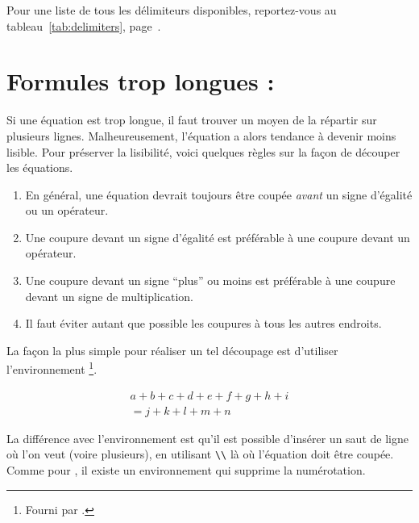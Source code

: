 Pour une liste de tous les délimiteurs disponibles, reportez-vous au
tableau~\ref{tab:delimiters}, page~\pageref{tab:delimiters}.


\section{Formules trop longues : }
\label{sec:multline}


Si une équation est trop longue, il faut trouver un moyen de la répartir sur
plusieurs lignes. Malheureusement, l'équation a alors tendance à devenir moins
lisible. Pour préserver la lisibilité, voici quelques règles sur la façon de
découper les équations.
\begin{enumerate}
  \item En général, une équation devrait toujours être coupée \emph{avant} un
    signe d'égalité ou un opérateur.
  \item Une coupure devant un signe d'égalité est préférable à une coupure
    devant un opérateur.
  \item Une coupure devant un signe \enquote{plus} ou moins est préférable à une
    coupure devant un signe de multiplication.
  \item Il faut éviter autant que possible les coupures à tous les autres
    endroits.
\end{enumerate}
La façon la plus simple pour réaliser un tel découpage est d'utiliser
l'environnement \footnote{Fourni par .}.
\begin{example}
\begin{multline}
  a + b + c + d + e + f 
  + g + h + i  
  \\
  = j + k + l + m + n 
\end{multline}
\end{example}
\noindent
La différence avec l'environnement  est qu'il est possible
d'insérer un saut de ligne où l'on veut (voire plusieurs), en utilisant
\verb+\\+ là où l'équation doit être coupée. Comme pour , il
existe un environnement  qui supprime la numérotation.

